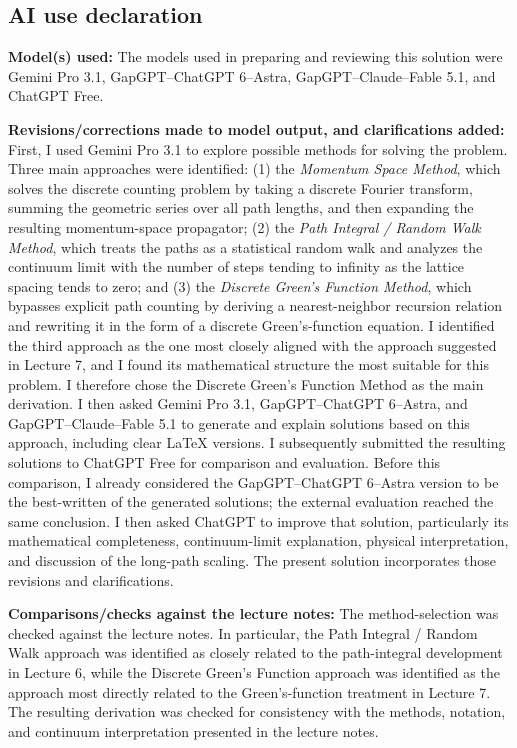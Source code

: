 \documentclass[11pt]{article}
\begin{document}
	\newpage
	
	\subsection*{AI use declaration}
	
	\textbf{Model(s) used:} The models used in preparing and reviewing this solution were Gemini Pro 3.1, GapGPT--ChatGPT 6--Astra, GapGPT--Claude--Fable 5.1, and ChatGPT Free.
	
	\textbf{Revisions/corrections made to model output, and clarifications added:} First, I used Gemini Pro 3.1 to explore possible methods for solving the problem. Three main approaches were identified: (1) the \emph{Momentum Space Method}, which solves the discrete counting problem by taking a discrete Fourier transform, summing the geometric series over all path lengths, and then expanding the resulting momentum-space propagator; (2) the \emph{Path Integral / Random Walk Method}, which treats the paths as a statistical random walk and analyzes the continuum limit with the number of steps tending to infinity as the lattice spacing tends to zero; and (3) the \emph{Discrete Green's Function Method}, which bypasses explicit path counting by deriving a nearest-neighbor recursion relation and rewriting it in the form of a discrete Green's-function equation. I identified the third approach as the one most closely aligned with the approach suggested in Lecture 7, and I found its mathematical structure the most suitable for this problem. I therefore chose the Discrete Green's Function Method as the main derivation. I then asked Gemini Pro 3.1, GapGPT--ChatGPT 6--Astra, and GapGPT--Claude--Fable 5.1 to generate and explain solutions based on this approach, including clear \LaTeX{} versions. I subsequently submitted the resulting solutions to ChatGPT Free for comparison and evaluation. Before this comparison, I already considered the GapGPT--ChatGPT 6--Astra version to be the best-written of the generated solutions; the external evaluation reached the same conclusion. I then asked ChatGPT to improve that solution, particularly its mathematical completeness, continuum-limit explanation, physical interpretation, and discussion of the long-path scaling. The present solution incorporates those revisions and clarifications.
	
	\textbf{Comparisons/checks against the lecture notes:} The method-selection was checked against the lecture notes. In particular, the Path Integral / Random Walk approach was identified as closely related to the path-integral development in Lecture 6, while the Discrete Green's Function approach was identified as the approach most directly related to the Green's-function treatment in Lecture 7. The resulting derivation was checked for consistency with the methods, notation, and continuum interpretation presented in the lecture notes.
	
\end{document}
